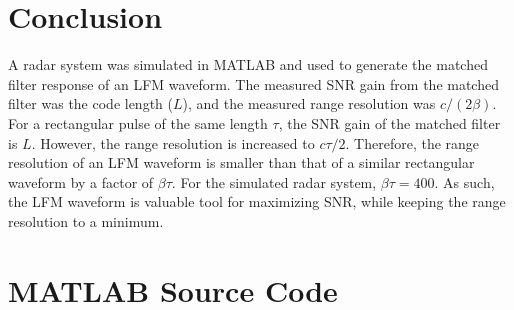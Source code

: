 \documentclass[conference]{IEEEtran}
\begin{document}
\section{Conclusion}
A radar system was simulated in MATLAB and used to generate the matched filter response of an LFM waveform. The measured SNR gain from the matched filter was the code length ($L$), and the measured range resolution was $c/(2\beta)$. For a rectangular pulse of the same length $\tau$, the SNR gain of the matched filter is $L$. However, the range resolution is increased to $c\tau/2$. Therefore, the range resolution of an LFM waveform is smaller than that of a similar rectangular waveform by a factor of $\beta\tau$. For the simulated radar system, $\beta\tau = 400$. As such, the LFM waveform is valuable tool for maximizing SNR, while keeping the range resolution to a minimum.

\onecolumn
\pagebreak
\appendices
\section{MATLAB Source Code}
\label{matlab_code}
\lstset{style=Matlab-editor}

\raggedbottom
\pagebreak

\raggedbottom
\end{document}
